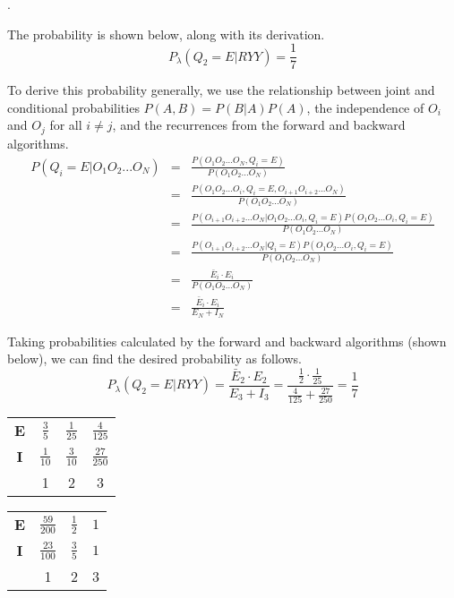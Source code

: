 \documentclass[a4paper, 10pt]{article}
\newcounter{prob_num}
\newcommand{\problem}{\vspace{20pt}\arabic{prob_num}.\stepcounter{prob_num}\par}
\begin{document}
\problem

The probability is shown below, along with its derivation.
\[ P_{\lambda}(Q_2 = E|RYY) = \frac{1}{7} \]

To derive this probability generally, we use the relationship between joint and conditional probabilities $P(A, B) = P(B|A)P(A)$, the independence of $O_i$ and $O_j$ for all $i \neq j$, and the recurrences from the forward and backward algorithms.
\renewcommand{\arraystretch}{1.75}
\begin{eqnarray}
P(Q_{i}=E|O_1 O_2...O_N) &=& \frac{P(O_1 O_2...O_N, Q_{i} = E)}{P(O_1 O_2...O_N)}                                                     \nonumber \\
                         &=& \frac{P(O_1 O_2...O_i, Q_{i} = E, O_{i+1} O_{i+2} ... O_N)}{P(O_1 O_2...O_N)}                            \nonumber \\
                         &=& \frac{P(O_{i+1} O_{i+2} ... O_N|O_1 O_2...O_i, Q_{i} = E)P(O_1 O_2...O_i, Q_{i} = E)}{P(O_1 O_2...O_N)}  \nonumber \\
                         &=& \frac{P(O_{i+1} O_{i+2} ... O_N|Q_{i} = E)P(O_1 O_2...O_i, Q_{i} = E)}{P(O_1 O_2...O_N)}                 \nonumber \\
                         &=& \frac{\bar{E}_i \cdot E_i}{P(O_1 O_2...O_N)}                                                             \nonumber \\
                         &=& \frac{\bar{E}_i \cdot E_i}{E_N + I_N}                                                                    \nonumber
\end{eqnarray}
\renewcommand{\arraystretch}{1}

Taking probabilities calculated by the forward and backward algorithms (shown below), we can find the desired probability as follows.
\[ P_{\lambda}(Q_2 = E|RYY) = \frac{\bar{E}_2 \cdot E_2}{E_3 + I_3} = \frac{\frac{1}{2} \cdot \frac{1}{25}}{\frac{4}{125} + \frac{27}{250}} = \frac{1}{7} \]

\renewcommand{\arraystretch}{2}
\begin{center}
\begin{tabular}{|c|c c c|}
  \hline
  \textbf{E} & $\frac{3}{5}$  & $\frac{1}{25}$ & $\frac{4}{125}$  \\
  \textbf{I} & $\frac{1}{10}$ & $\frac{3}{10}$ & $\frac{27}{250}$ \\
  \hline
             & 1 & 2 & 3 \\
  \hline
\end{tabular}
\begin{tabular}{|c|c c c|}
  \hline
  \textbf{E} & $\frac{59}{200}$ & $\frac{1}{2}$ & $1$  \\
  \textbf{I} & $\frac{23}{100}$ & $\frac{3}{5}$ & $1$ \\
  \hline
             & 1 & 2 & 3 \\
  \hline
\end{tabular}
\end{center}
\renewcommand{\arraystretch}{1}
\end{document}
